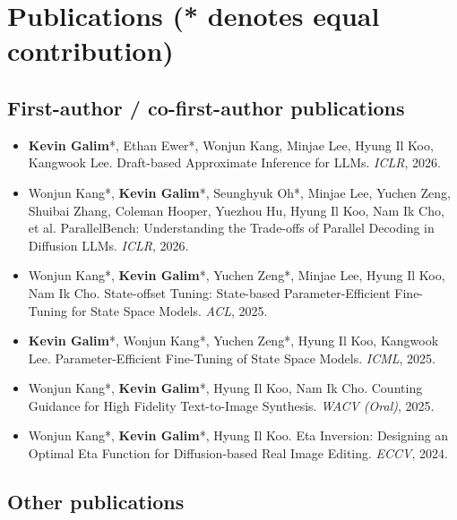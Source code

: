 \documentclass[10pt,a4paper]{article}
\begin{document}
\section{Publications {\normalfont\small (* denotes equal contribution)}}

\subsection*{First-author / co-first-author publications}

\begin{itemize}[leftmargin=1.2em]
  \item \textbf{Kevin Galim}*, Ethan Ewer*, Wonjun Kang, Minjae Lee, Hyung Il Koo, Kangwook Lee.
Draft-based Approximate Inference for LLMs.
\textit{ICLR}, 2026.
  \item Wonjun Kang*, \textbf{Kevin Galim}*, Seunghyuk Oh*, Minjae Lee, Yuchen Zeng, Shuibai Zhang, Coleman Hooper, Yuezhou Hu, Hyung Il Koo, Nam Ik Cho, et al.
ParallelBench: Understanding the Trade-offs of Parallel Decoding in Diffusion LLMs.
\textit{ICLR}, 2026.
  \item Wonjun Kang*, \textbf{Kevin Galim}*, Yuchen Zeng*, Minjae Lee, Hyung Il Koo, Nam Ik Cho.
State-offset Tuning: State-based Parameter-Efficient Fine-Tuning for State Space Models.
\textit{ACL}, 2025.
  \item \textbf{Kevin Galim}*, Wonjun Kang*, Yuchen Zeng*, Hyung Il Koo, Kangwook Lee.
Parameter-Efficient Fine-Tuning of State Space Models.
\textit{ICML}, 2025.
  \item Wonjun Kang*, \textbf{Kevin Galim}*, Hyung Il Koo, Nam Ik Cho.
Counting Guidance for High Fidelity Text-to-Image Synthesis.
\textit{WACV (Oral)}, 2025.
  \item Wonjun Kang*, \textbf{Kevin Galim}*, Hyung Il Koo.
Eta Inversion: Designing an Optimal Eta Function for Diffusion-based Real Image Editing.
\textit{ECCV}, 2024.
\end{itemize}

\subsection*{Other publications}
\end{document}

